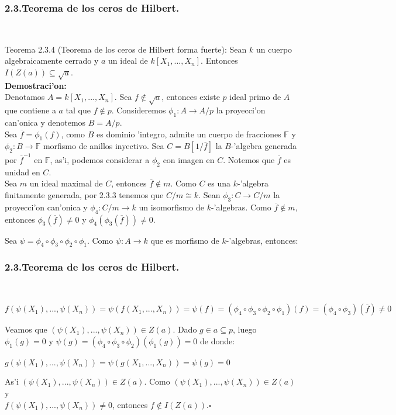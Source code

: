 \documentclass[10pt]{beamer}
\renewcommand{\F}{\mathbb{F}}
\begin{document}
\begin{frame}
\frametitle{2.3.Teorema de los ceros de Hilbert.}\\
\begin{block}{Teorema 2.3.4 (Teorema de los ceros de Hilbert forma fuerte):}
Sean $k$ un cuerpo algebraicamente cerrado y $a$ un ideal de $k[X_1,...,X_n]$. Entonces $I(Z(a))\subseteq \sqrt{a}$.\\
\textbf{Demostraci'on:}\\
Denotamos $A=k[X_1,...,X_n]$. Sea $f \not \in \sqrt{a}$, entonces existe $p$ ideal primo de $A$ que contiene a $a$ tal que $f \not \in p$. Consideremos $\phi _1: A \rightarrow A/p$ la proyecci'on can'onica y denotemos $B=A/p$.\\
Sea $\overline{f}=\phi _1(f)$, como $B$ es dominio 'integro, admite un cuerpo de fracciones $\F$ y $\phi _2 :B \rightarrow \F$ morfismo de anillos inyectivo. Sea $C=B[1/\overline{f}]$ la $B$-'algebra generada por $\overline{f}^{-1}$ en $\F$, as'i, podemos considerar a $\phi _2$ con imagen en $C$. Notemos que $\overline{f}$ es unidad en $C$.\\
 Sea $m$ un ideal maximal de $C$, entonces $\overline{f} \not \in m$. Como $C$ es una $k$-'algebra finitamente generada, por 2.3.3 tenemos que $C/m \cong k$. Sean $\phi _3 :C \rightarrow C/m$ la proyecci'on can'onica y $\phi _4 :C/m \rightarrow k$ un isomorfismo de $k$-'algebras. Como $\overline{f} \not \in m$, entonces $\phi_3 (\overline{f}) \not = 0$ y $\phi_4 (\phi_3 (\overline{f}))\not = 0$.\

Sea $\psi = \phi_4 \circ \phi_3 \circ \phi_2 \circ \phi_1$. Como $\psi : A \rightarrow k$ que es morfismo de $k$-'algebras, entonces:\\
\end{block}
\end{frame}

\begin{frame}
\frametitle{2.3.Teorema de los ceros de Hilbert.}\\
\begin{block}{}
\begin{center}
 $f(\psi(X_1),...,\psi(X_n)) =\psi(f(X_1,...,X_n))=\psi(f)= (\phi_4 \circ \phi_3 \circ \phi_2 \circ \phi_1)(f)=(\phi_4 \circ \phi_3 )(\overline{f}) \not = 0$
\end{center}
Veamos que $(\psi(X_1),...,\psi(X_n)) \in Z(a)$. Dado $g \in a \subseteq p$, luego $\phi_1 (g)=0$ y $\psi(g)=(\phi_4 \circ \phi_3 \circ \phi_2)( \phi_1(g))=0$ de donde:\\
\begin{center}
 $g(\psi(X_1),...,\psi(X_n)) =\psi(g(X_1,...,X_n))=\psi(g) = 0$\\
\end{center}
As'i $(\psi(X_1),...,\psi(X_n)) \in Z(a)$. Como $(\psi(X_1),...,\psi(X_n)) \in Z(a)$ y \\
$f(\psi(X_1),...,\psi(X_n))\not = 0$, entonces $f \not \in I(Z(a))$.\hfill $\square$\\
\end{block}
\vspace{4cm}
\end{frame}
\end{document}
